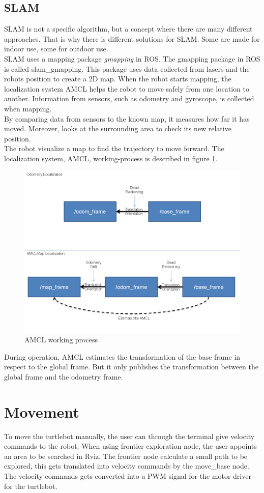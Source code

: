 \subsection{SLAM}
SLAM is not a specific algorithm, but a concept where there are many different approaches. That is why there is different solutions for SLAM. Some are made for indoor use, some for outdoor use.\\
SLAM uses a mapping package \textit{gmapping} in ROS. The gmapping package in ROS is called slam\_gmapping. This package uses data collected from lasers and the robots position to create a 2D map. %
When the robot starts mapping, the localization system AMCL helps the robot to move safely from one location to another.
Information from sensors, such as odometry and gyroscope, is collected when mapping. \\
By comparing data from sensors to the known map, it measures how far it has moved. Moreover, looks at the surrounding area to check its new relative position.\\The robot visualize a map to find the trajectory to move forward. The localization system, AMCL, working-process is described in figure \ref{fig:amcl}.
\begin{figure}
    \centering
    \includegraphics[width=.7\textwidth]{figures/AMCL.png}
    \caption{AMCL working process\cite{AMCL}} 
    \label{fig:amcl} 
\end{figure}
 During operation, AMCL estimates the transformation of the base frame in respect to the global frame. But it only publishes the transformation between the global frame and the odometry frame\cite{AMCL}.\\
%
%
%
%
\section{Movement}

To move the turtlebot manually, the user can through the terminal give velocity commands to the robot. When using frontier exploration node, the user appoints an area to be searched in Rviz. The frontier node calculate a small path to be explored, this gets translated into velocity commands by the move\_base node. The velocity commands gets converted into a PWM signal for the motor driver for the turtlebot.

